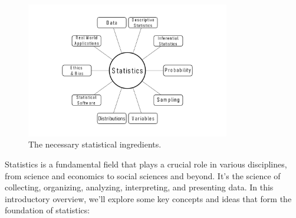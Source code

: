 \documentclass[
  a4paper,
]{scrbook}
\begin{document}
\begin{figure}[ht]

{\centering \includegraphics[width=3.5in,height=\textheight,keepaspectratio]{chapter000/000_basics_root.png}

}

\caption{The necessary statistical ingredients.}

\end{figure}%

Statistics is a fundamental field that plays a crucial role in various
disciplines, from science and economics to social sciences and beyond.
It's the science of collecting, organizing, analyzing, interpreting, and
presenting data. In this introductory overview, we'll explore some key
concepts and ideas that form the foundation of statistics:
\end{document}
